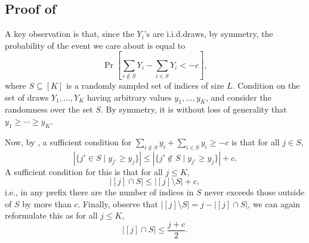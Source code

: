     

\subsection{Proof of }

	A key observation is that, since the $Y_i$'s are i.i.d.\@ draws, by symmetry, the probability of the event we care about is equal to
	\[
		\Pr\left[\sum_{i \notin S} Y_{i} - \sum_{i  \in S} Y_{i} < -c\right],
	\]
	where $S \subseteq [K]$ is a randomly sampled set of indices of size $L$. Condition on the set of draws $Y_1, \ldots, Y_K$ having arbitrary values $y_1, \ldots, y_K$, and consider the randomness over the set $S$. By symmetry, it is without loss of generality that $y_1 \ge \cdots \ge y_K$.

    Now, by , a sufficient condition for $\sum_{i \notin S} y_i + \sum_{i \in S} y_i \ge -c$ is that for all $j \in S$, $$|\{j' \in S \mid y_{j'} \ge y_j\}| \le |\{j' \notin S\mid y_{j'} \ge y_j\}| + c.$$
    A sufficient condition for this is that for all $j \le K$, $$|[j] \cap S| \le |[j] \setminus S| + c,$$ i.e., in any prefix there are the number of indices in $S$ never exceeds those outside of $S$ by more than $c$. Finally, observe that $|[j] \setminus S| = j - |[j] \cap S|$, we can again reformulate this as for all $j \le K$,
    \[
        |[j] \cap S| \le \frac{j + c}{2}.
    \]
	
